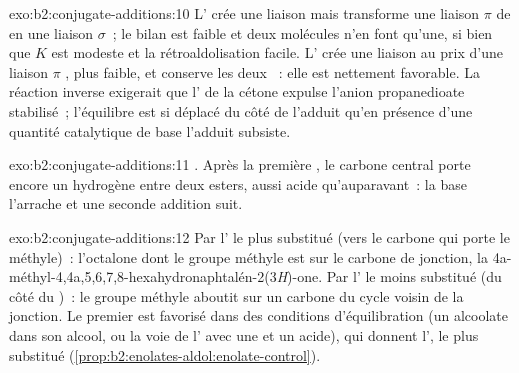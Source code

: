 \begin{solution}{exo:b2:conjugate-additions:10}
L' crée une liaison  mais transforme une liaison $\pi$ de  en une liaison
 $\sigma$~; le bilan est faible et deux molécules n'en font qu'une, si bien que $K$ est modeste et
la rétroaldolisation facile. L' crée une liaison  au prix d'une liaison $\pi$
, plus faible, et conserve les deux
~: elle est nettement favorable. La réaction inverse exigerait que l' de la cétone expulse
l'anion propanedioate stabilisé~; l'équilibre est si déplacé du côté de l'adduit qu'en présence d'une
quantité catalytique de base l'adduit subsiste.
\end{solution}

\begin{solution}{exo:b2:conjugate-additions:11}
. Après la première , le carbone central porte encore
un hydrogène entre deux esters, aussi acide qu'auparavant~: la base l'arrache et une seconde addition suit.
\end{solution}

\begin{solution}{exo:b2:conjugate-additions:12}
Par l' le plus substitué (vers le carbone qui porte le méthyle)~: l'octalone dont le groupe méthyle
est sur le carbone de jonction, la 4a-méthyl-4,4a,5,6,7,8-hexahydronaphtalén-2(3\textit{H})-one. Par
l' le moins substitué (du côté du )~: le groupe méthyle aboutit sur un carbone du cycle voisin
de la jonction. Le premier est favorisé dans des conditions d'équilibration (un alcoolate dans son alcool,
ou la voie de l' avec une  et un acide), qui donnent l', le
plus substitué (\cref{prop:b2:enolates-aldol:enolate-control}).
\end{solution}

